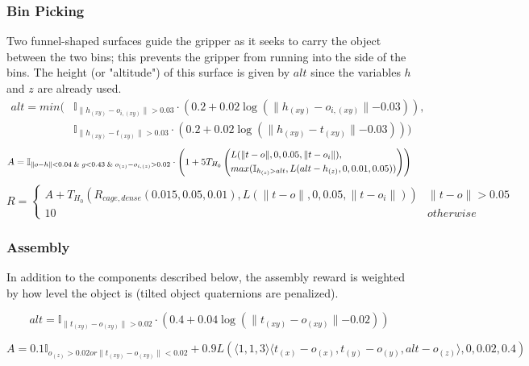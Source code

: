 {\subsubsection{Bin Picking}
Two funnel-shaped surfaces guide the gripper as it seeks to carry the object between the two bins; this prevents the gripper from running into the side of the bins. The height (or "altitude") of this surface is given by $alt$ since the variables $h$ and $z$ are already used.
\[
\begin{aligned}
alt = min (&\mathbb{I}_{\lVert h_{(xy)} - o_{i,(xy)} \lVert > 0.03} \cdot
    \left(0.2 + 0.02\log \left(\lVert h_{(xy)} - o_{i,(xy)} \lVert - 0.03\right)\right), \\
    & \mathbb{I}_{\lVert h_{(xy)} - t_{(xy)} \lVert > 0.03} \cdot
    \left(0.2 + 0.02\log\left(\lVert h_{(xy)} - t_{(xy)} \lVert - 0.03\right)\right))
\end{aligned}
\]
\[
A=\mathbb{I}_{\lVert o - h \rVert < 0.04 \And g < 0.43 \And o_{(z)} - o_{i,(z)} > 0.02} \cdot
    \left(1 + 5T_{H_0}\left(
        \begin{aligned}
        &L(\lVert t - o \rVert, 0, 0.05, \lVert t - o_i \rVert), \\
        & max(\mathbb{I}_{h_{(z)} > alt}, L(alt - h_{(z)}, 0, 0.01, 0.05))\\
        \end{aligned}
    \right)\right)
\]
\[
R=\left\{
    \begin{array}{ll}
        A + 
        T_{H_0}\left(
            R_{cage,dense}(0.015,0.05,0.01),
            L(\lVert t - o \rVert, 0, 0.05, \lVert t - o_i \rVert)
        \right)
            & \lVert t - o \rVert > 0.05 \\
        10
            & otherwise
    \end{array}
\right.
\]

\subsubsection{Assembly}
In addition to the components described below, the assembly reward is weighted by how level the object is (tilted object quaternions are penalized).

\[
alt = \mathbb{I}_{\lVert t_{(xy)} - o_{(xy)} \lVert > 0.02} \cdot \left(0.4 + 0.04\log\left(\lVert t_{(xy)} - o_{(xy)} \lVert-0.02\right) \right)
\]

\[
A=0.1\mathbb{I}_{o_{(z)} > 0.02 or \lVert t_{(xy)} - o_{(xy)} \lVert < 0.02} + 
    0.9L(\langle 1, 1, 3 \rangle \langle t_{(x)} - o_{(x)}, t_{(y)} - o_{(y)}, alt - o_{(z)} \rangle, 0, 0.02, 0.4)
\]

}
